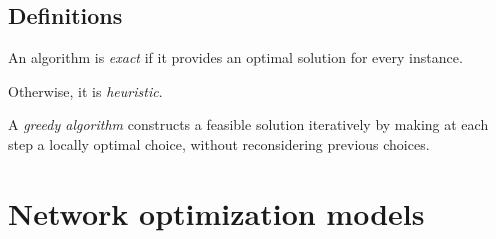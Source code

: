 \documentclass[12pt, a4paper]{report}
\newtheorem[style=M,bodystyle=\normalfont]{theorem}{Theorem}
\newtheorem[style=M,bodystyle=\normalfont]{corollary}{Corollary}
\newtheorem[style=M,bodystyle=\normalfont]{lemma}{Lemma}
\newtheorem[style=M,bodystyle=\normalfont]{definition}{Definition}
\begin{document}
    \section{Definitions}
    \begin{definition}
        An algorithm is \emph{exact} if it provides an optimal solution for every instance. 
        
        Otherwise, it is \emph{heuristic}. 
    \end{definition}
    \begin{definition}
        A \emph{greedy algorithm} constructs a feasible solution iteratively by making at each step a locally optimal choice, without reconsidering previous choices. 
    \end{definition}





















\newpage

\chapter{Network optimization models}
\end{document}
